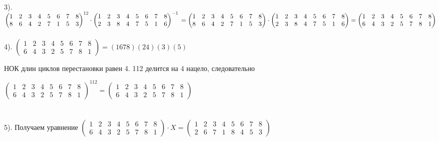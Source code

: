 \documentclass[a4paper, 12pt]{article}
\begin{document}
    \\ 3). $\begin{pmatrix}1 & 2 & 3 & 4 & 5 & 6 & 7 & 8 \\ 8 & 6 & 4 & 2 & 7 & 1 & 5 & 3 \end{pmatrix}^{12} \cdot \begin{pmatrix}1 & 2 & 3 & 4 & 5 & 6 & 7 & 8 \\ 2 & 3 & 8 & 4 & 7 & 5 & 1 & 6 \end{pmatrix}^{-1} \\ = \begin{pmatrix}1 & 2 & 3 & 4 & 5 & 6 & 7 & 8 \\ 8 & 6 & 4 & 2 & 7 & 1 & 5 & 3 \end{pmatrix} \cdot \begin{pmatrix}1 & 2 & 3 & 4 & 5 & 6 & 7 & 8 \\ 2 & 3 & 8 & 4 & 7 & 5 & 1 & 6 \end{pmatrix} = \begin{pmatrix}1 & 2 & 3 & 4 & 5 & 6 & 7 & 8 \\ 6 & 4 & 3 & 2 & 5 & 7 & 8 & 1 \end{pmatrix}$
    \\
    \\ 4). $\begin{pmatrix}1 & 2 & 3 & 4 & 5 & 6 & 7 & 8 \\ 6 & 4 & 3 & 2 & 5 & 7 & 8 & 1 \end{pmatrix} = (1678)(24)(3)(5)$
    \\
    \par НОК длин циклов перестановки равен 4. 112 делится на 4 нацело, следовательно 
    \par $\begin{pmatrix}1 & 2 & 3 & 4 & 5 & 6 & 7 & 8 \\ 6 & 4 & 3 & 2 & 5 & 7 & 8 & 1 \end{pmatrix}^{112} = \begin{pmatrix}1 & 2 & 3 & 4 & 5 & 6 & 7 & 8 \\ 6 & 4 & 3 & 2 & 5 & 7 & 8 & 1 \end{pmatrix}$
    \\
    \\
    \\ 5). Получаем уравнение $\begin{pmatrix}1 & 2 & 3 & 4 & 5 & 6 & 7 & 8 \\ 6 & 4 & 3 & 2 & 5 & 7 & 8 & 1 \end{pmatrix} \cdot X = \begin{pmatrix}1 & 2 & 3 & 4 & 5 & 6 & 7 & 8 \\ 2 & 6 & 7 & 1 & 8 & 4 & 5 & 3 \end{pmatrix}$
\end{document}
